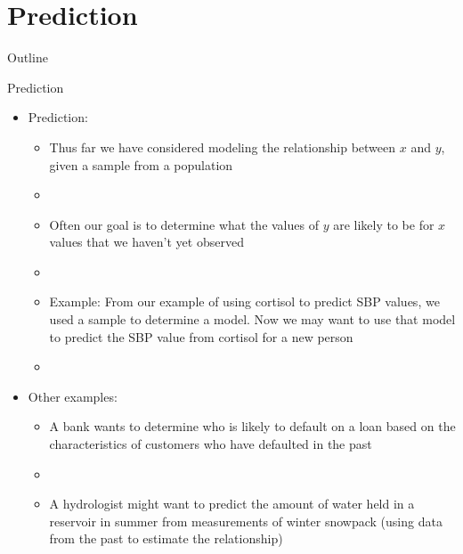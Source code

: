 \documentclass[xcolor=dvipsnames]{beamer}
\begin{document}
\section{Prediction}

\begin{frame}{Outline}
\tableofcontents[currentsection,subsectionstyle=show/shaded/hide]
\end{frame}

\begin{frame}{Prediction}
	\begin{itemize}
		\item Prediction:
		\begin{itemize}
			\item Thus far we have considered modeling the relationship between $x$ and $y$, given a sample from a population
			\item[]
			\item Often our goal is to determine what the values of $y$ are likely to be for $x$ values that we haven't yet observed
			\item[]
			\item Example: From our example of using cortisol to predict SBP values, we used a sample to determine a model. Now we may want to use that model to predict the SBP value from cortisol for a new person 
			\item[]
		\end{itemize}
				\item Other examples:
	\begin{itemize}
		\item A bank wants to determine who is likely to default on a loan based on the characteristics of customers who have defaulted in the past
		\item[]
		\item A hydrologist might want to predict the amount of water held in a reservoir in summer from measurements of winter snowpack (using data from the past to estimate the relationship)
	\end{itemize}
	\end{itemize}
\end{frame}
\end{document}

